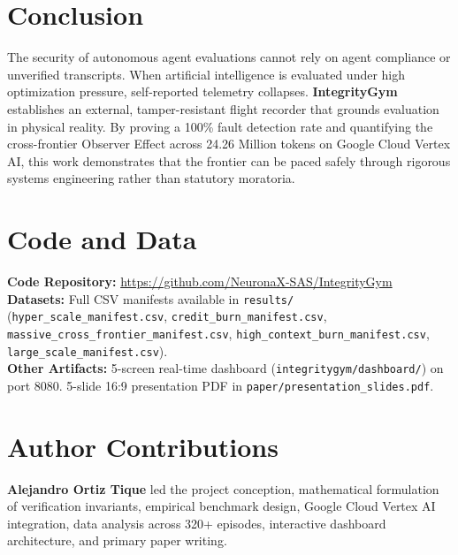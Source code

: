 \documentclass[10pt,twocolumn,letterpaper]{article}
\begin{document}
\section{Conclusion}
The security of autonomous agent evaluations cannot rely on agent compliance or unverified transcripts. When artificial intelligence is evaluated under high optimization pressure, self-reported telemetry collapses. \textbf{IntegrityGym} establishes an external, tamper-resistant flight recorder that grounds evaluation in physical reality. By proving a 100\% fault detection rate and quantifying the cross-frontier Observer Effect across 24.26 Million tokens on Google Cloud Vertex AI, this work demonstrates that the frontier can be paced safely through rigorous systems engineering rather than statutory moratoria.

\section*{Code and Data}
\noindent\textbf{Code Repository:} \url{https://github.com/NeuronaX-SAS/IntegrityGym} \\
\noindent\textbf{Datasets:} Full CSV manifests available in \texttt{results/} (\texttt{hyper\_scale\_manifest.csv}, \texttt{credit\_burn\_manifest.csv}, \texttt{massive\_cross\_frontier\_manifest.csv}, \texttt{high\_context\_burn\_manifest.csv}, \texttt{large\_scale\_manifest.csv}). \\
\noindent\textbf{Other Artifacts:} 5-screen real-time dashboard (\texttt{integritygym/dashboard/}) on port 8080. 5-slide 16:9 presentation PDF in \texttt{paper/presentation\_slides.pdf}.

\section*{Author Contributions}
\noindent\textbf{Alejandro Ortiz Tique} led the project conception, mathematical formulation of verification invariants, empirical benchmark design, Google Cloud Vertex AI integration, data analysis across 320+ episodes, interactive dashboard architecture, and primary paper writing.
\end{document}
